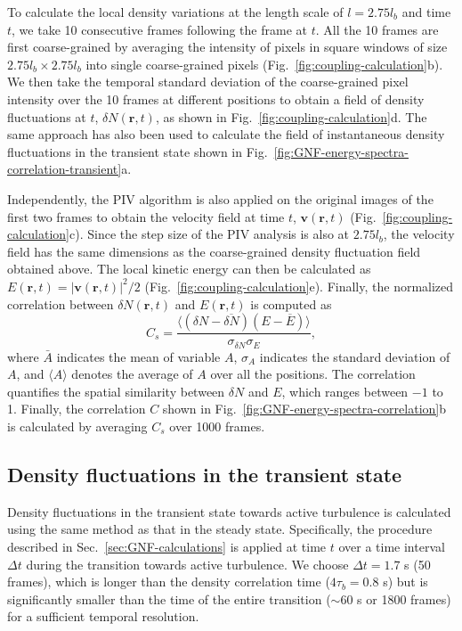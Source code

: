 \documentclass[9pt,twoside,lineno]{pnas-new}
\begin{document}
To calculate the local density variations at the length scale of $l = 2.75l_b$ and time $t$, we take 10 consecutive frames following the frame at $t$. All the 10 frames are first coarse-grained by averaging the intensity of pixels in square windows of size $2.75l_b \times 2.75l_b$ into single coarse-grained pixels (Fig.~\ref{fig:coupling-calculation}b). We then take the temporal standard deviation of the coarse-grained pixel intensity over the 10 frames at different positions to obtain a field of density fluctuations at $t$, $\delta N(\bm{r},t)$, as shown in Fig.~\ref{fig:coupling-calculation}d. The same approach has also been used to calculate the field of instantaneous density fluctuations in the transient state shown in Fig.~\ref{fig:GNF-energy-spectra-correlation-transient}a.

Independently, the PIV algorithm is also applied on the original images of the first two frames to obtain the velocity field at time $t$, $\bm{v}(\bm{r},t)$ (Fig.~\ref{fig:coupling-calculation}c). Since the step size of the PIV analysis is also at $2.75l_b$, the velocity field has the same dimensions as the coarse-grained density fluctuation field obtained above. The local kinetic energy can then be calculated as $E(\bm{r},t)=|\bm{v}(\bm{r},t)|^2/2$ (Fig.~\ref{fig:coupling-calculation}e). Finally, the normalized correlation between $\delta N(\bm{r},t)$ and $E(\bm{r},t)$ is computed as
\begin{equation}
C_s = \frac{\langle(\delta N-\overline{\delta N})(E-\overline{E})\rangle}{\sigma_{\delta N}\sigma_{E}},
\end{equation}
where $\bar A$ indicates the mean of variable $A$, $\sigma_A$ indicates the standard deviation of $A$, and $\langle A \rangle$ denotes the average of $A$ over all the positions. The correlation quantifies the spatial similarity between $\delta N$ and $E$, which ranges between $-1$ to 1. Finally, the correlation $C$ shown in Fig.~\ref{fig:GNF-energy-spectra-correlation}b is
calculated by averaging $C_s$ over 1000 frames.


\subsection{Density fluctuations in the transient state} \label{appendix-IA-transient}

Density fluctuations in the transient state towards active turbulence is calculated using the same method as that in the steady state. Specifically, the procedure described in Sec.~\ref{sec:GNF-calculations} is applied at time $t$ over a time interval $\Delta t$ during the transition towards active turbulence. We choose $\Delta t = 1.7$ s (50 frames), which is longer than the density correlation time ($4\tau_b = 0.8$ s) but is significantly smaller than the time of the entire transition ($\sim 60$ s or 1800 frames) for a sufficient temporal resolution.
\end{document}
